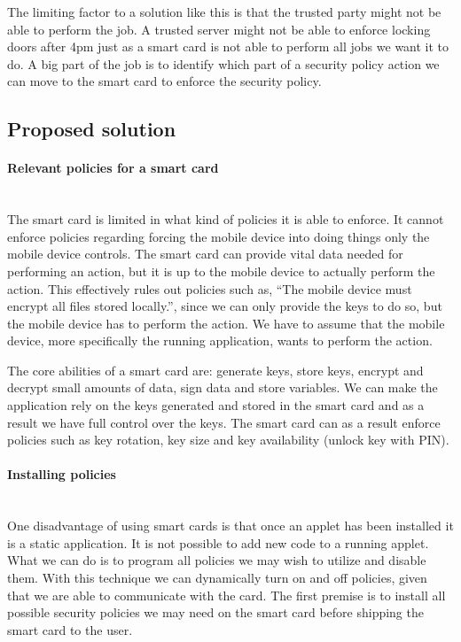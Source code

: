 The limiting factor to a solution like this is that the trusted party might not be able to perform the job. A trusted server might not be able to enforce locking doors after 4pm just as a smart card is not able to perform all jobs we want it to do. A big part of the job is to identify which part of a security policy action we can move to the smart card to enforce the security policy.

\subsection{Proposed solution}
\label{sec:policySolution}

\paragraph{Relevant policies for a smart card}\mbox{}\\
The smart card is limited in what kind of policies it is able to enforce. It cannot enforce policies regarding forcing the mobile device into doing things only the mobile device controls. The smart card can provide vital data needed for performing an action, but it is up to the mobile device to actually perform the action. This effectively rules out policies such as, ``The mobile device must encrypt all files stored locally.'', since we can only provide the keys to do so, but the mobile device has to perform the action. We have to assume that the mobile device, more specifically the running application, wants to perform the action.

The core abilities of a smart card are: generate keys, store keys, encrypt and decrypt small amounts of data, sign data and store variables. We can make the application rely on the keys generated and stored in the smart card and as a result we have full control over the keys. The smart card can as a result enforce policies such as key rotation, key size and key availability (unlock key with PIN).

\paragraph{Installing policies}\mbox{}\\
One disadvantage of using smart cards is that once an applet has been installed it is a static application. It is not possible to add new code to a running applet. What we can do is to program all policies we may wish to utilize and disable them. With this technique we can dynamically turn on and off policies, given that we are able to communicate with the card. The first premise is to install all possible security policies we may need on the smart card before shipping the smart card to the user.

